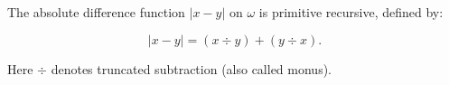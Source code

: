 The absolute difference function $|x - y|$ on $\omega$ is primitive recursive, defined by:

$$|x - y| = (x \div y) + (y \div x).$$

Here $\div$ denotes truncated subtraction (also called monus).
